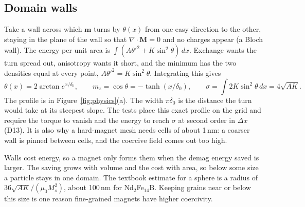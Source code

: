 \documentclass[10pt,a4paper]{article}
\newcommand{\mo}{\mu_0}
\newcommand{\vm}{\mathbf{m}}
\newcommand{\dec}[1]{\textcolor{comment}{\small(#1)}}
\begin{document}
\subsection{Domain walls}
Take a wall across which $\vm$ turns by $\theta(x)$ from one easy direction to the other, staying in the plane of the
wall so that $\nabla\cdot\mathbf{M} = 0$ and no charges appear (a Bloch wall). The energy per unit area is $\int
(A\theta'^2 + K\sin^2\theta)\,dx$. Exchange wants the turn spread out, anisotropy wants it short, and the minimum has
the two densities equal at every point, $A\theta'^2 = K\sin^2\theta$. Integrating this gives
\[
  \theta(x) = 2\arctan e^{x/\delta_0}, \qquad m_z = \cos\theta = -\tanh(x/\delta_0), \qquad
  \sigma = \int 2K\sin^2\theta\,dx = 4\sqrt{AK}.
\]
The profile is in Figure~\ref{fig:physics}(a). The width $\pi\delta_0$ is the distance the turn would take at its
steepest slope. The tests place this exact profile on the grid and require the torque to vanish and the energy to reach
$\sigma$ at second order in $\Delta x$ \dec{D13}. It is also why a hard-magnet mesh needs cells of about 1\,nm: a coarser
wall is pinned between cells, and the coercive field comes out too high.

Walls cost energy, so a magnet only forms them when the demag energy saved is larger. The saving grows with volume and
the cost with area, so below some size a particle stays in one domain. The textbook estimate for a sphere is a radius of
$36\sqrt{AK}/(\mo M_s^2)$, about 100\,nm for Nd$_2$Fe$_{14}$B. Keeping grains near or below this size is one reason
fine-grained magnets have higher coercivity.
\end{document}
